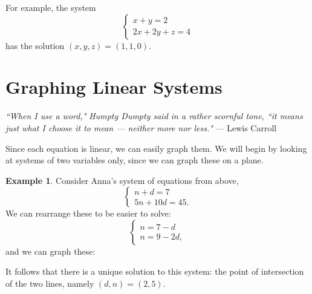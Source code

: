 \documentclass[a4paper,leqno]{article}
\numberwithin{equation}{section}
\theoremstyle{definition}
\newtheorem{ex}[equation]{Example}
\theoremstyle{remark}
\begin{document}
For example, the system
\begin{equation}
  \begin{cases}
    x + y = 2\\
    2x + 2y + z = 4
  \end{cases}
\end{equation}
has the solution $ (x,y,z) = (1,1,0) $.

\section{Graphing Linear Systems}
\begin{center}
  \emph{``When I use a word," Humpty Dumpty said in a rather scornful tone, ``it means just what I choose it to mean --- neither more nor less." } --- Lewis Carroll
\end{center}
Since each equation is linear, we can easily graph them. We will begin by looking at systems of two variables only, since we can graph
these on a plane.

\begin{ex}
  Consider Anna's system of equations from above,
  \begin{equation}
    \begin{cases}
      n + d = 7\\
      5n + 10d = 45.
    \end{cases}
  \end{equation}
  We can rearrange these to be easier to solve:
  \begin{equation}
    \begin{cases}
      n = 7 - d\\
      n = 9 - 2d,
    \end{cases}
  \end{equation}
  and we can graph these:
  \begin{center}
  \end{center}
  It follows that there is a unique solution to this system: the point of intersection of the two lines, namely $ (d,n) = (2,5) $.
\end{ex}
\end{document}
